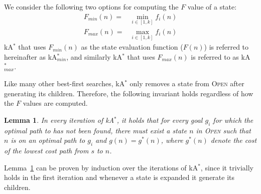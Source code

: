 \documentclass{aicom2e}
\newtheorem{lemma}{Lemma}
\newcommand{\astar}{A$^*$}
\newcommand{\kastar}{kA$^*$}
\newcommand{\kastarmin}{kA$^*_{min}$}
\newcommand{\kastarmax}{kA$^*_{max}$}
\newcommand{\minf}{$F_{min}(n)$}
\newcommand{\maxf}{$F_{max}(n)$}
\newcommand{\open}{\textsc{Open}}
\begin{document}
We consider the following two options for computing the $F$ value of a state:
\begin{align}
\text{\minf{}}=&\min_{i\in [1,k]}f_i(n) \\
\text{\maxf{}}=&\max_{i\in [1,k]}f_i(n)
\end{align}
\kastar{} that uses \minf{} as the state evaluation function ($F(n)$) is referred to hereinafter as \kastarmin{}, and similarly \kastar{}
that uses \maxf{} is referred to as \kastarmax{}. 



Like many other best-first searches, \kastar{} only removes a state from \open{} after generating its children. Therefore, the following invariant holds regardless of how the $F$ values are computed. 
\begin{lemma}
	In every iteration of \kastar{}, it holds that 
	for every goal $g_i$ for which the optimal path to has not been found, 
	there must exist a state $n$ in \open{} such that $n$ is on an optimal path 
	to $g_i$ and $g(n)=g^*(n)$, where $g^*(n)$ denote the cost of the lowest cost path from $s$ to $n$. 
	\label{lem:simple}
\end{lemma}
Lemma~\ref{lem:simple} can be proven by induction over the iterations of \kastar{}, 
since it trivially holds in the first iteration and whenever a state is expanded it generate its children. 
\end{document}

